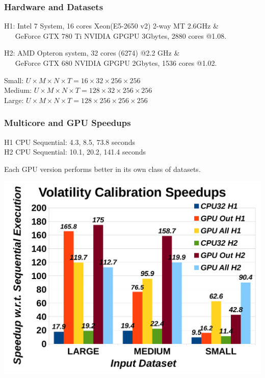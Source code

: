 \documentclass{beamer}
\newcommand{\emphh}[1]{\textcolor{CosGreen}{ #1}}
\begin{document}
\begin{frame}[fragile,t]
    \frametitle{Hardware and Datasets}

H1: Intel 7 System, 16 cores  Xeon(E5-2650 v2) 2-way MT \@2.6GHz \&\\
$\mbox{ }~~~~$GeForce GTX 780 Ti NVIDIA GPGPU 3Gbytes, 2880 cores @1.08.\\\smallskip

H2: AMD Opteron system, 32 cores (6274) @2.2 GHz \&\\
$\mbox{ }~~~~$GeForce GTX 680 NVIDIA GPGPU 2Gbytes, 1536 cores @1.02.\\\bigskip

Small: $U\times M\times N\times T = 16 \times 32 \times 256 \times 256$\\
Medium: $U\times M\times N\times T= 128\times 32\times 256\times 256$\\
Large: $U\times M\times N\times T= 128\times 256\times 256\times 256$

\end{frame}

\begin{frame}[fragile,t]
  \frametitle{Multicore and GPU Speedups}

H1 CPU Sequential: 4.3,   8.5, 73.8 seconds\\
H2 CPU Sequential: 10.1,  20.2, 141.4 seconds

\emphh{Each GPU version performs better in its own class of datasets.}

\begin{center} 
\includegraphics[height=37ex]{Figures/VolCalibRes} 
\end{center} 


\end{frame}
\end{document}
